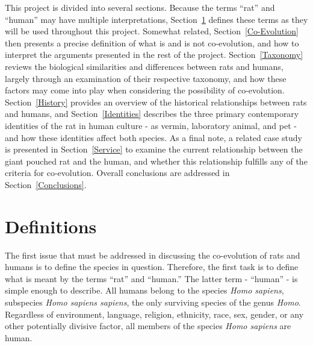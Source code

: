 \documentclass[12pt]{article}
\begin{document}
This project is divided into several sections. Because the terms ``rat'' and ``human'' may have multiple interpretations, Section~\ref{Definitions} defines these terms as they will be used throughout this project. Somewhat related, Section~\ref{Co-Evolution} then presents a precise definition of what is and is not co-evolution, and how to interpret the arguments presented in the rest of the project. Section~\ref{Taxonomy} reviews the biological similarities and differences between rats and humans, largely through an examination of their respective taxonomy, and how these factors may come into play when considering the possibility of co-evolution. Section~\ref{History} provides an overview of the historical relationships between rats and humans, and Section~\ref{Identities} describes the three primary contemporary identities of the rat in human culture - as vermin, laboratory animal, and pet - and how these identities affect both species. As a final note, a related case study is presented in Section~\ref{Service} to examine the current relationship between the giant pouched rat and the human, and whether this relationship fulfills any of the criteria for co-evolution. Overall conclusions are addressed in Section~\ref{Conclusions}.

\section{Definitions} \label{Definitions}

The first issue that must be addressed in discussing the co-evolution of rats and humans is to define the species in question. Therefore, the first task is to define what is meant by the terms ``rat'' and ``human.'' The latter term - ``human'' - is simple enough to describe. All humans belong to the species \textit{Homo sapiens}, subspecies \textit{Homo sapiens sapiens}, the only surviving species of the genus \textit{Homo}. Regardless of environment, language, religion, ethnicity, race, sex, gender, or any other potentially divisive factor, all members of the species \textit{Homo sapiens} are human.
\end{document}
